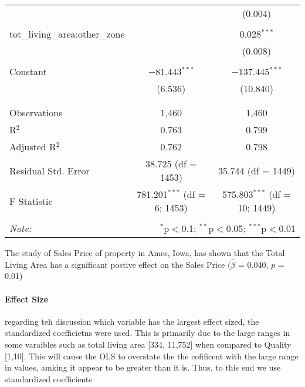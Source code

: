 \documentclass{article}
\begin{document}
\begin{table}[!htbp]
\begin{tabular}{@{\extracolsep{5pt}}lcc}
  &  & (0.004) \\ 
  & & \\ 
 tot\_living\_area:other\_zone &  & 0.028$^{***}$ \\ 
  &  & (0.008) \\ 
  & & \\ 
 Constant & $-$81.443$^{***}$ & $-$137.445$^{***}$ \\ 
  & (6.536) & (10.840) \\ 
  & & \\ 
\hline \\[-1.8ex] 
Observations & 1,460 & 1,460 \\ 
R$^{2}$ & 0.763 & 0.799 \\ 
Adjusted R$^{2}$ & 0.762 & 0.798 \\ 
Residual Std. Error & 38.725 (df = 1453) & 35.744 (df = 1449) \\ 
F Statistic & 781.201$^{***}$ (df = 6; 1453) & 575.803$^{***}$ (df = 10; 1449) \\ 
\hline 
\hline \\[-1.8ex] 
\textit{Note:}  & \multicolumn{2}{r}{$^{*}$p$<$0.1; $^{**}$p$<$0.05; $^{***}$p$<$0.01} \\ 
\end{tabular} 
\end{table}


The study of Sales Price of property in Ames, Iowa, has shown that the Total Living Area has a significant postive effect on the Sales Price ($\hat{\beta}$ = 0.040, $p$ = 0.01)

\paragraph{Effect Size} regarding teh discussion which variable has the largest effect sized, the standardized coefficietns were used. This is primarily due to the large ranges in some varaibles such as total living area [334, 11,752] when compared to Quality [1,10]. This will cause the OLS to overstate the the cofificent with the large range in values, amking it appear to be greater than it is. Thus, to this end we use standardized coefficients
\end{document}
